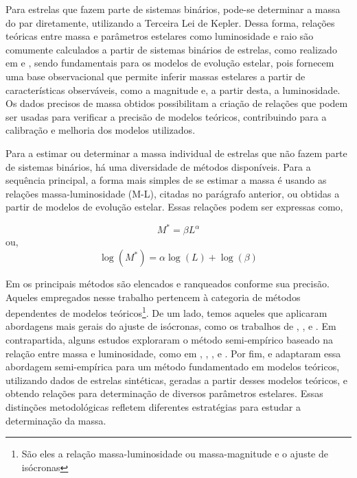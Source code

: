        Para estrelas que fazem parte de sistemas binários, pode-se determinar a massa do par diretamente, utilizando a Terceira Lei de Kepler. Dessa forma, relações teóricas entre massa e parâmetros estelares como luminosidade e raio são comumente calculados a partir de sistemas binários de estrelas, como realizado em  e , sendo fundamentais para os modelos de evolução estelar, pois fornecem uma base observacional que permite inferir massas estelares a partir de características observáveis, como a magnitude e, a partir desta, a luminosidade. Os dados precisos de massa obtidos possibilitam a criação de relações que podem ser usadas para verificar a precisão de modelos teóricos, contribuindo para a calibração e melhoria dos modelos utilizados.
        
        Para a estimar ou determinar a massa individual de estrelas que não fazem parte de sistemas binários, há uma diversidade de métodos disponíveis. Para a sequência principal, a forma mais simples de se estimar a massa é usando as relações massa-luminosidade (M-L), citadas no parágrafo anterior, ou obtidas a partir de modelos de evolução estelar. Essas relações podem ser expressas como,
        
        \begin{equation}
			\label{eq:massai}
			M^* =  \beta L^\alpha
		\end{equation}
		ou,
		\begin{equation}
			\label{eq:massa1}
			\log(M^*) =  \alpha \log(L) + \log(\beta)
		\end{equation}
        
        Em  os principais métodos são elencados e ranqueados conforme sua precisão. Aqueles empregados nesse trabalho pertencem à categoria de métodos dependentes de modelos teóricos\footnote{ São eles a relação massa-luminosidade ou massa-magnitude e o ajuste de isócronas}.
        De um lado, temos aqueles que aplicaram abordagens mais gerais do ajuste de isócronas, como os trabalhos de  , ,  e . Em contrapartida, alguns estudos exploraram o método semi-empírico baseado na relação entre massa e luminosidade, como em , , 
        ,   e  . Por fim,  e  adaptaram essa abordagem semi-empírica para um método fundamentado em modelos teóricos, utilizando dados de estrelas sintéticas, geradas a partir desses modelos teóricos, e obtendo relações para determinação de diversos parâmetros estelares. Essas distinções metodológicas refletem diferentes estratégias para estudar a determinação da massa.
        
